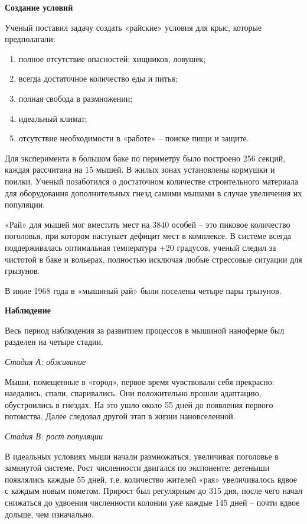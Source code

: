 \textbf{Создание условий}

Ученый поставил задачу создать «райские» условия для крыс, которые предполагали:
\begin{enumerate}
    \item полное отсутствие опасностей: хищников, ловушек;
    \item всегда достаточное количество еды и питья;
    \item полная свобода в размножении;
    \item идеальный климат;
    \item отсутствие необходимости в «работе» – поиске пищи и защите.
\end{enumerate}

Для эксперимента в большом баке по периметру было построено 256 секций, каждая рассчитана на 15 мышей. В жилых зонах установлены кормушки и поилки. Ученый позаботился о достаточном количестве строительного материала для оборудования дополнительных гнезд самими мышами в случае увеличения их популяции.

«Рай» для мышей мог вместить мест на 3840 особей – это пиковое количество поголовья, при котором наступает дефицит мест в комплексе. В системе всегда поддерживалась оптимальная температура +20 градусов, ученый следил за чистотой в баке и вольерах, полностью исключая любые стрессовые ситуации для грызунов.

В июле 1968 года в «мышиный рай» были поселены четыре пары грызунов.

\textbf{Наблюдение}

Весь период наблюдения за развитием процессов в мышиной наноферме был разделен на четыре стадии.

\textit{Стадия А: обживание}

Мыши, помещенные в «город», первое время чувствовали себя прекрасно: наедались, спали, спаривались. Они положительно прошли адаптацию, обустроились в гнездах. На это ушло около 55 дней до появления первого потомства. Далее следовал другой этап в жизни нановселенной.

\textit{Стадия В: рост популяции}

В идеальных условиях мыши начали размножаться, увеличивая поголовье в замкнутой системе. Рост численности двигался по экспоненте: детеныши появлялись каждые 55 дней, т.е. количество жителей «рая» увеличивалось вдвое с каждым новым пометом. Прирост был регулярным до 315 дня, после чего начал снижаться до удвоения численности колонии уже каждые 145 дней – почти вдвое дольше, чем изначально.

